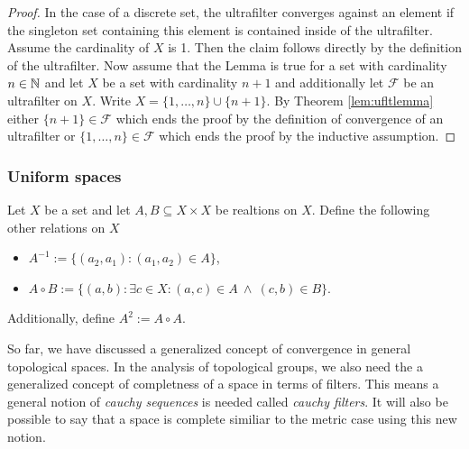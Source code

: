 \begin{proof}
  In the case of a discrete set, the ultrafilter converges against an element if the singleton set containing this element is contained inside of the ultrafilter.
  Assume the cardinality of $X$ is 1. Then the claim follows directly by the definition of the ultrafilter.
Now assume that the Lemma is true for a set with cardinality $n \in \mathbb{N}$ and let $X$ be a set with cardinality $n+1$ and additionally let $\mathcal{F}$ be an ultrafilter on $X$. Write $X = \{1, \ldots, n\} \cup \{n+1\}$. By Theorem \ref{lem:ufltlemma} either $\{n+1\} \in \mathcal{F}$ which ends the proof by the definition of convergence of an ultrafilter or $\{1,\ldots,n\} \in \mathcal{F}$ which ends the proof by the inductive assumption.
\end{proof}

\subsubsection{Uniform spaces}

\begin{defin}
  Let $X$ be a set and let $A, B \subseteq X \times X$ be realtions on $X$.
  Define the following other relations on $X$
  \begin{itemize}
    \item $A^{-1} := \{(a_2, a_1)\colon (a_1, a_2) \in A\}$,
    \item $A \circ B := \{(a, b)\colon \exists c \in X\colon (a, c) \in A \: \land \: (c, b) \in B\}$.
  \end{itemize}
  Additionally, define $A^2 := A \circ A$.  
\end{defin}

So far, we have discussed a generalized concept of convergence in general topological spaces. In the analysis of topological groups, we also need the a generalized concept of completness of a space in terms of filters. This means a general notion of \textit{cauchy sequences} is needed called \textit{cauchy filters}. It will also be possible to say that a space is complete similiar to the metric case using this new notion.

